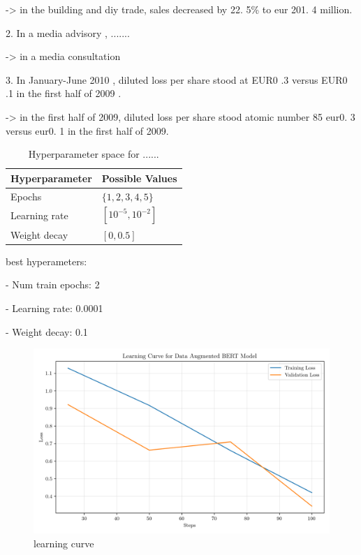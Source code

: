 \documentclass[conference]{IEEEtran}
\begin{document}
-> in the building and diy trade, sales decreased by 22. 5\% to eur 201. 4 million.

2. In a media advisory , .......

-> in a media consultation

3. In January-June 2010 , diluted loss per share stood at EUR0 .3 versus EUR0 .1 in the first half of 2009 .

-> in the first half of 2009, diluted loss per share stood atomic number 85 eur0. 3 versus eur0. 1 in the first half of 2009.




\begin{table}[H]
\centering
\caption{Hyperparameter space for ......}
\label{parameters_basebert}
\begin{tabular}{ll}
\toprule
\textbf{Hyperparameter} & \textbf{Possible Values} \\
\midrule
Epochs & $\{1,2,3,4,5\}$ \\
Learning rate & $[10^{-5}, 10^{-2}]$ \\
Weight decay & $[0, 0.5]$ \\
\bottomrule
\end{tabular}
\end{table}

best hyperameters: 

- Num train epochs: 2

- Learning rate: 0.0001

- Weight decay: 0.1

\begin{figure}[H]
    \centering
    \includegraphics[width=1\linewidth]{assets/data_augmented_bert_learninc_curve.png}
    \caption{learning curve}
    \label{fig:data_augmented_bert_learninc_curve}
\end{figure}
\end{document}
